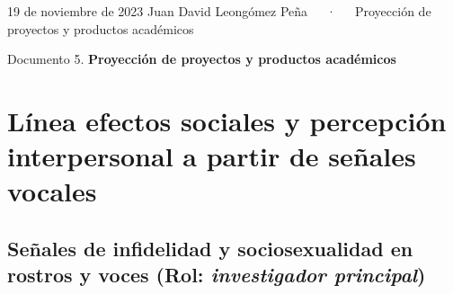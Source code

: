 \documentclass[11pt,a4paper,]{awesome-cv}
\begin{document}
\makecvheader

\makecvfooter
  {19 de noviembre de 2023}
    {Juan David Leongómez Peña~~~·~~~Proyección de proyectos y productos
académicos}
  {\thepage}





\vspace{4mm}
\begin{tcolorbox}[enhanced,
        on line, 
        boxsep=4pt, left=0pt,right=0pt,top=0pt,bottom=0pt,
        colframe=white,colback=black]
  
\color{white}
\begin{LARGE}\begin{center}
Documento 5. \textbf{Proyección de proyectos y productos académicos}
\end{center}\end{LARGE}
\end{tcolorbox}

\hypertarget{luxednea-efectos-sociales-y-percepciuxf3n-interpersonal-a-partir-de-seuxf1ales-vocales}{%
\section{Línea efectos sociales y percepción interpersonal a partir de
señales
vocales}\label{luxednea-efectos-sociales-y-percepciuxf3n-interpersonal-a-partir-de-seuxf1ales-vocales}}

\space

\hypertarget{seuxf1ales-de-infidelidad-y-sociosexualidad-en-rostros-y-voces-rol-investigador-principal}{%
\subsection{\texorpdfstring{Señales de infidelidad y sociosexualidad en
rostros y voces (Rol: \emph{investigador
principal})}{Señales de infidelidad y sociosexualidad en rostros y voces (Rol: investigador principal)}}\label{seuxf1ales-de-infidelidad-y-sociosexualidad-en-rostros-y-voces-rol-investigador-principal}}
\end{document}
